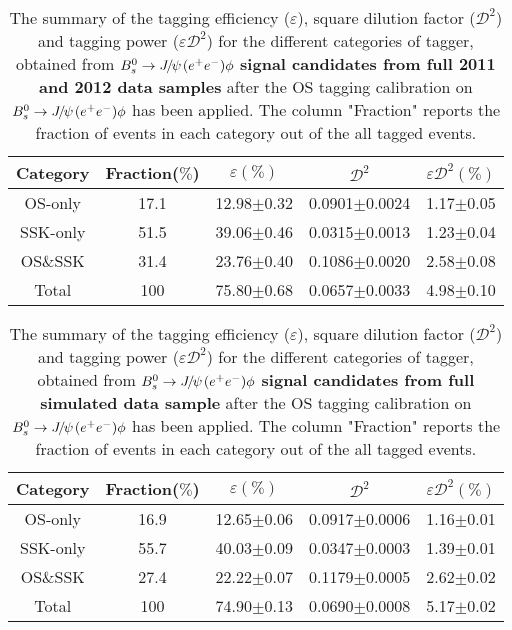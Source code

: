 \begin{table}[htb]
  \caption{
   The summary of the tagging efficiency ($\varepsilon$), square dilution factor ($\mathcal{D}^{2}$) and tagging power ($\varepsilon\mathcal{D}^{2}$) for the different categories of tagger, obtained from ${{B}^0_{s}}\rightarrow{\ensuremath{{J\mskip -3mu/\mskip -2mu\psi\mskip 2mu}}}({e^+e^-})\phi$ {\bf signal candidates from full 2011 and 2012 data samples} after the OS tagging calibration on ${{B}^0_{s}}\rightarrow{\ensuremath{{J\mskip -3mu/\mskip -2mu\psi\mskip 2mu}}}({e^+e^-})\phi$ has been applied. The column "Fraction" reports the fraction of events in each category out of the all tagged events.}
    \small{
\begin{center}\begin{tabular}{ccccc}
   \hline
    Category & Fraction($\%$)&$\varepsilon(\%)$ & $\mathcal{D}^{2}$ & $\varepsilon\mathcal{D}^{2}(\%)$\\
  \hline
    OS-only& 17.1 &12.98$\pm$0.32 &  0.0901$\pm$0.0024 & 1.17$\pm$0.05 \\
     SSK-only& 51.5 &39.06$\pm$0.46 & 0.0315$\pm$0.0013  & 1.23$\pm$0.04 \\
     OS$\&$SSK& 31.4 &23.76$\pm$0.40 &  0.1086$\pm$0.0020 & 2.58$\pm$0.08 \\
    \hline
     Total& 100 &75.80$\pm$0.68 & 0.0657$\pm$0.0033& 4.98$\pm$0.10 \\
    \hline
    \end{tabular}\end{center}
  }
\label{tab:FTperformanceRDfullOS}
\end{table}

\begin{table}[htb]
  \caption{
   The summary of the tagging efficiency ($\varepsilon$), square dilution factor ($\mathcal{D}^{2}$) and tagging power ($\varepsilon\mathcal{D}^{2}$) for the different categories of tagger, obtained from ${{B}^0_{s}}\rightarrow{\ensuremath{{J\mskip -3mu/\mskip -2mu\psi\mskip 2mu}}}({e^+e^-})\phi$ {\bf signal candidates from full simulated data sample} after the OS tagging calibration on ${{B}^0_{s}}\rightarrow{\ensuremath{{J\mskip -3mu/\mskip -2mu\psi\mskip 2mu}}}({e^+e^-})\phi$ has been applied. The column "Fraction" reports the fraction of events in each category out of the all tagged events. }
    \small{
\begin{center}\begin{tabular}{ccccc}
   \hline
    Category & Fraction($\%$)&$\varepsilon(\%)$ & $\mathcal{D}^{2}$ & $\varepsilon\mathcal{D}^{2}(\%)$\\
  \hline
    OS-only& 16.9 &12.65$\pm$0.06 &  0.0917$\pm$0.0006 &  1.16$\pm$0.01 \\
     SSK-only& 55.7&40.03$\pm$0.09 &  0.0347$\pm$0.0003 &  1.39$\pm$0.01 \\
     OS$\&$SSK& 27.4&22.22$\pm$0.07 &  0.1179$\pm$0.0005 &  2.62$\pm$0.02 \\
    \hline
     Total& 100 &74.90$\pm$0.13 & 0.0690$\pm$0.0008 & 5.17$\pm$0.02 \\
    \hline
    \end{tabular}\end{center}
  }
\label{tab:FTperformanceMCfullOS}
\end{table}

